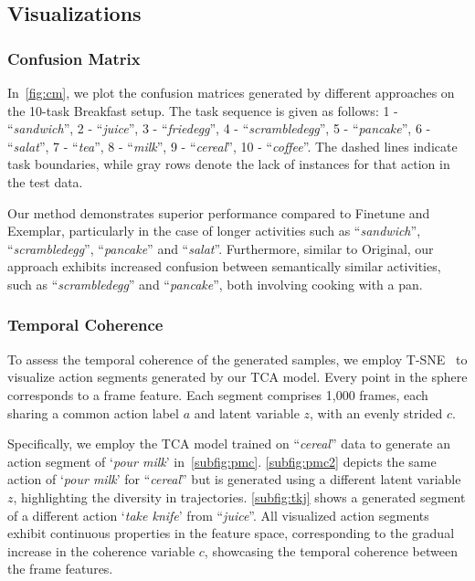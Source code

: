 \subsection{Visualizations}

\subsubsection{Confusion Matrix}



In~\cref{fig:cm}, we plot the confusion matrices generated by different approaches on the 10-task Breakfast setup. The task sequence is given as follows: 1 - ``\textit{sandwich}'',  2 - ``\textit{juice}'', 3 - ``\textit{friedegg}'', 4 - ``\textit{scrambledegg}'', 5 - ``\textit{pancake}'', 6 - ``\textit{salat}'', 7  - ``\textit{tea}'', 8 - ``\textit{milk}'', 9 - ``\textit{cereal}'', 10 - ``\textit{coffee}''. The dashed lines indicate task boundaries, while gray rows denote the lack of instances for that action in the test data.

Our method demonstrates superior performance compared to Finetune and Exemplar, particularly in the case of longer activities such as ``\textit{sandwich}'', ``\textit{scrambledegg}'', ``\textit{pancake}'' and ``\textit{salat}''.  
Furthermore, similar to Original, our approach exhibits increased confusion between semantically similar activities, such as ``\textit{scrambledegg}'' and ``\textit{pancake}'', both involving cooking with a pan.

\subsubsection{Temporal Coherence} 



To assess the temporal coherence of the generated samples, we employ T-SNE~\cite{van2008visualizing} to visualize action segments generated by our TCA model. Every point in the sphere corresponds to a frame feature. Each segment comprises 1,000 frames, each sharing a common action label $a$ and latent variable $z$, with an evenly strided $c$. 

Specifically, we employ the TCA model trained on ``\textit{cereal}'' data to generate an action segment of `\textit{pour milk}' in~\cref{subfig:pmc}. \cref{subfig:pmc2} depicts the same action of `\textit{pour milk}' for ``\textit{cereal}'' but is generated using a different latent variable $z$, highlighting the diversity in trajectories. \cref{subfig:tkj} shows a generated segment of a different action `\textit{take knife}' from ``\textit{juice}''. All visualized action segments exhibit continuous properties in the feature space, corresponding to the gradual increase in the coherence variable $c$, showcasing the temporal coherence between the frame features.